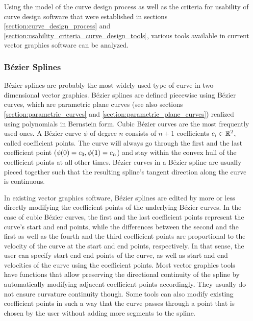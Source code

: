 \documentclass[a4paper]{article}
\begin{document}
			Using the model of the curve design process as well as the criteria for usability of curve design software that were established in sections \ref{section:curve_design_process} and \ref{section:usability_criteria_curve_design_tools}, various tools available in current vector graphics software can be analyzed.

			\subsubsection{Bézier Splines}
			\label{section:bézier_splines}

				Bézier splines are probably the most widely used type of curve in two-dimensional vector graphics. Bézier splines are defined piecewise using Bézier curves, which are parametric plane curves (see also sections \ref{section:parametric_curves} and \ref{section:parametric_plane_curves}) realized using polynomials in Bernstein form. Cubic Bézier curves are the most frequently used ones. A Bézier curve \(\phi\) of degree \(n\) consists of \(n + 1\) coefficients \(c_i \in \mathbb{R}^{2}\), called coefficient points. The curve will always go through the first and the last coefficient point (\(\phi\!\left( 0 \right) = c_0, \phi\!\left( 1 \right) = c_n\)) and stay within the convex hull of the coefficient points at all other times. Bézier curves in a Bézier spline are usually pieced together such that the resulting spline's tangent direction along the curve is continuous.

				In existing vector graphics software, Bézier splines are edited by more or less directly modifying the coefficient points of the underlying Bézier curves. In the case of cubic Bézier curves, the first and the last coefficient points represent the curve's start and end points, while the differences between the second and the first as well as the fourth and the third coefficient points are proportional to the velocity of the curve at the start and end points, respectively. In that sense, the user can specify start end end points of the curve, as well as start and end velocities of the curve using the coefficient points. Most vector graphics tools have functions that allow preserving the directional continuity of the spline by automatically modifying adjacent coefficient points accordingly. They usually do not ensure curvature continuity though. Some tools can also modify existing coefficient points in such a way that the curve passes through a point that is chosen by the user without adding more segments to the spline.
\end{document}
